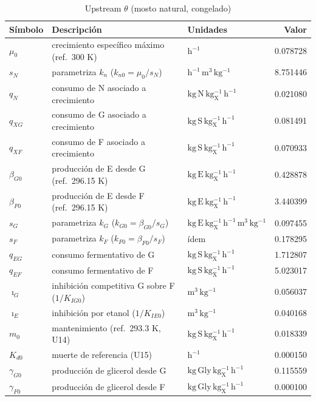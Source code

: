 \documentclass[11pt,a4paper]{article}
\begin{document}
\begin{small}
\begin{longtable}{@{}l p{6.6cm} p{3.6cm} r@{}}
\caption{Upstream $\theta$ (mosto natural, congelado)}\\
\toprule
Símbolo & Descripción & Unidades & Valor \\
\midrule
\endhead
$\mu_0$ & crecimiento específico máximo (ref.\ 300 K) & $\mathrm{h^{-1}}$ & 0.078728 \\
$s_N$ & parametriza $k_n$ ($k_{n0}=\mu_0/s_N$) & $\mathrm{h^{-1}\,m^{3}\,kg^{-1}}$ & 8.751446 \\
$q_N$ & consumo de N asociado a crecimiento & $\mathrm{kg\,N\,kg_X^{-1}\,h^{-1}}$ & 0.021080 \\
$q_{XG}$ & consumo de G asociado a crecimiento & $\mathrm{kg\,S\,kg_X^{-1}\,h^{-1}}$ & 0.081491 \\
$q_{XF}$ & consumo de F asociado a crecimiento & $\mathrm{kg\,S\,kg_X^{-1}\,h^{-1}}$ & 0.070933 \\
$\beta_{G0}$ & producción de E desde G (ref.\ 296.15 K) & $\mathrm{kg\,E\,kg_X^{-1}\,h^{-1}}$ & 0.428878 \\
$\beta_{F0}$ & producción de E desde F (ref.\ 296.15 K) & $\mathrm{kg\,E\,kg_X^{-1}\,h^{-1}}$ & 3.440399 \\
$s_G$ & parametriza $k_G$ ($k_{G0}=\beta_{G0}/s_G$) & $\mathrm{kg\,E\,kg_X^{-1}\,h^{-1}\,m^{3}\,kg^{-1}}$ & 0.097455 \\
$s_F$ & parametriza $k_F$ ($k_{F0}=\beta_{F0}/s_F$) & ídem & 0.178295 \\
$q_{EG}$ & consumo fermentativo de G & $\mathrm{kg\,S\,kg_X^{-1}\,h^{-1}}$ & 1.712807 \\
$q_{EF}$ & consumo fermentativo de F & $\mathrm{kg\,S\,kg_X^{-1}\,h^{-1}}$ & 5.023017 \\
$\imath_G$ & inhibición competitiva G sobre F ($1/K_{IG0}$) & $\mathrm{m^{3}\,kg^{-1}}$ & 0.056037 \\
$\imath_E$ & inhibición por etanol ($1/K_{IE0}$) & $\mathrm{m^{3}\,kg^{-1}}$ & 0.040168 \\
$m_0$ & mantenimiento (ref.\ 293.3 K, U14) & $\mathrm{kg\,S\,kg_X^{-1}\,h^{-1}}$ & 0.018339 \\
$K_{d0}$ & muerte de referencia (U15) & $\mathrm{h^{-1}}$ & 0.000150 \\
$\gamma_{G0}$ & producción de glicerol desde G & $\mathrm{kg\,Gly\,kg_X^{-1}\,h^{-1}}$ & 0.115559 \\
$\gamma_{F0}$ & producción de glicerol desde F & $\mathrm{kg\,Gly\,kg_X^{-1}\,h^{-1}}$ & 0.000100 \\
\bottomrule
\end{longtable}


\end{small}
\end{document}
